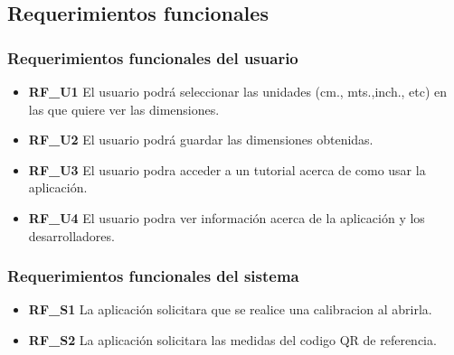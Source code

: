 \subsection{Requerimientos funcionales}

\subsubsection{Requerimientos funcionales del usuario}
\begin{itemize}
\item \textbf{RF\_U1} El usuario podrá seleccionar las unidades (cm., mts.,inch., etc) en las que quiere ver las dimensiones.
\item \textbf{RF\_U2} El usuario podrá guardar las dimensiones obtenidas.
\item \textbf{RF\_U3} El usuario podra acceder a un tutorial acerca de como usar la aplicación.
\item \textbf{RF\_U4} El usuario podra ver información acerca de la aplicación y los desarrolladores.
\end{itemize}

\subsubsection{Requerimientos funcionales del sistema}
\begin{itemize}
\item \textbf{RF\_S1} La aplicación solicitara que se realice una calibracion al abrirla.
\item \textbf{RF\_S2} La aplicación solicitara las medidas del codigo QR de referencia.
\end{itemize}